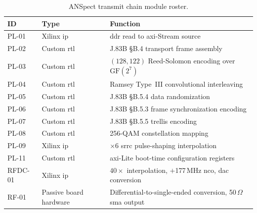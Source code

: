 \begin{table}[htbp]
  \caption{ANSpect transmit chain module roster.}
  \label{tab:module_roster}
  \centering
  \small
  \begin{tabular}{lp{2.6cm}p{8.5cm}}
    \hline
    ID      & Type                   & Function \\
    \hline
    PL-01   & Xilinx \ac{ip}         & \ac{ddr} read to \ac{axi}-Stream source \\[2pt]
    PL-02   & Custom \ac{rtl}        & J.83B \S B.4 transport frame assembly \\[2pt]
    PL-03   & Custom \ac{rtl}        & $(128,122)$ Reed-Solomon encoding over $\mathrm{GF}(2^{7})$ \\[2pt]
    PL-04   & Custom \ac{rtl}        & Ramsey Type~III convolutional interleaving \\[2pt]
    PL-05   & Custom \ac{rtl}        & J.83B \S B.5.4 data randomization \\[2pt]
    PL-06   & Custom \ac{rtl}        & J.83B \S B.5.3 frame synchronization encoding \\[2pt]
    PL-07   & Custom \ac{rtl}        & J.83B \S B.5.5 trellis encoding \\[2pt]
    PL-08   & Custom \ac{rtl}        & 256-QAM constellation mapping \\[2pt]
    PL-09   & Xilinx \ac{ip}         & ${\times}6$ \ac{srrc} pulse-shaping interpolation \\[2pt]
    PL-11   & Custom \ac{rtl}        & \ac{axi}-Lite boot-time configuration registers \\[2pt]
    RFDC-01 & Xilinx \ac{ip}         & $40{\times}$ interpolation, $+$177\,MHz \ac{nco}, \ac{dac} conversion \\[2pt]
    RF-01   & Passive board hardware & Differential-to-single-ended conversion, 50\,$\Omega$ \ac{sma} output \\
    \hline
  \end{tabular}
\end{table}
\FloatBarrier

